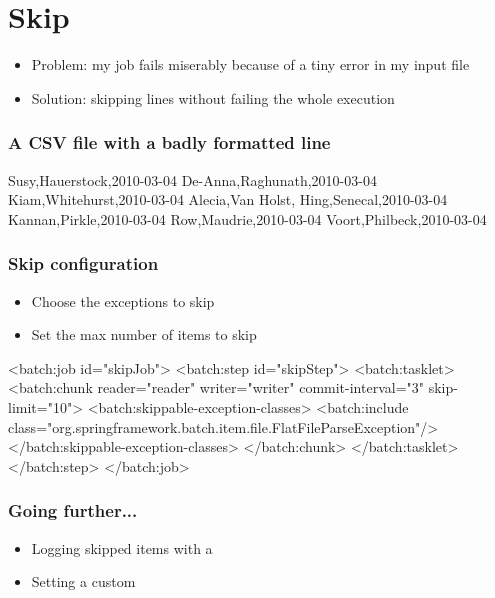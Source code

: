 \section{Skip}

\begin{frame}
 \begin{itemize}
  \item Problem: my job fails miserably because of a tiny error in my input file
  \item Solution: skipping lines without failing the whole execution
 \end{itemize}
\end{frame}

\begin{frame}[fragile]
 \frametitle{A CSV file with a badly formatted line}
 
\begin{textcode}
Susy,Hauerstock,2010-03-04
De-Anna,Raghunath,2010-03-04
Kiam,Whitehurst,2010-03-04
Alecia,Van Holst,%
Hing,Senecal,2010-03-04
Kannan,Pirkle,2010-03-04
Row,Maudrie,2010-03-04
Voort,Philbeck,2010-03-04
\end{textcode}
 
\end{frame}

\begin{frame}[fragile]
 \frametitle{Skip configuration}
 \begin{itemize}
  \item Choose the exceptions to skip
  \item Set the max number of items to skip
 \end{itemize}

 \begin{xmlcode}
<batch:job id="skipJob">
  <batch:step id="skipStep">
    <batch:tasklet>
      <batch:chunk reader="reader" writer="writer" commit-interval="3"
                   skip-limit="10">
        <batch:skippable-exception-classes>
          <batch:include
          class="org.springframework.batch.item.file.FlatFileParseException"/>
        </batch:skippable-exception-classes>
      </batch:chunk>
    </batch:tasklet>
  </batch:step>
</batch:job>
\end{xmlcode}

\end{frame}

\begin{frame}
 \frametitle{Going further...}
 \begin{itemize} 
  \item Logging skipped items with a 
  \item Setting a custom 
 \end{itemize}
\end{frame}

